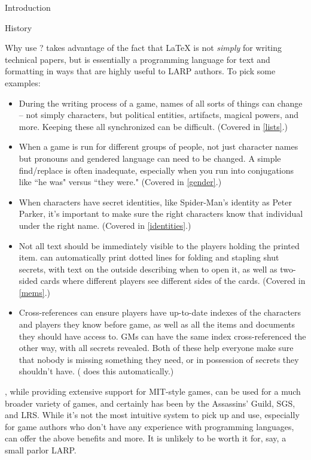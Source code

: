 \documentclass[sheet]{GameTexBase}
\begin{document}
\begin{section}{Introduction}
\begin{subsection}{History}
\end{subsection}
\begin{subsection}{Why use \gametex{}?}
\gametex{} takes advantage of the fact that \LaTeX{} is not \textit{simply} for writing technical papers, but is essentially a programming language for text and formatting in ways that are highly useful to LARP authors.  To pick some examples:
\begin{itemize}
    \item During the writing process of a game, names of all sorts of things can change – not simply characters, but political entities, artifacts, magical powers, and more.  Keeping these all synchronized can be difficult.  (Covered in \ref{lists}.)
    \item When a game is run for different groups of people, not just character names but pronouns and gendered language can need to be changed.  A simple find/replace is often inadequate, especially when you run into conjugations like ``he was" versus ``they were."  (Covered in \ref{gender}.)
		\item When characters have secret identities, like Spider-Man's identity as Peter Parker, it's important to make sure the right characters know that individual under the right name.  (Covered in \ref{identities}.)
    \item Not all text should be immediately visible to the players holding the printed item.  \gametex{} can automatically print dotted lines for folding and stapling shut secrets, with text on the outside describing when to open it, as well as two-sided cards where different players see different sides of the cards.  (Covered in \ref{mems}.)
    \item Cross-references can ensure players have up-to-date indexes of the characters and players they know before game, as well as all the items and documents they should have access to.  GMs can have the same index cross-referenced the other way, with all secrets revealed.  Both of these help everyone make sure that nobody is missing something they need, or in possession of secrets they shouldn't have.  (\gametex{} does this automatically.)
\end{itemize}
\gametex{}, while providing extensive support for MIT-style games, can be used for a much broader variety of games, and certainly has been by the Assassins' Guild, SGS, and LRS.  
While it's not the most intuitive system to pick up and use, especially for game authors who don't have any experience with programming languages, \gametex{} can offer the above benefits and more.  It is unlikely to be worth it for, say, a small parlor LARP.


\end{subsection}
\end{section}
\end{document}
